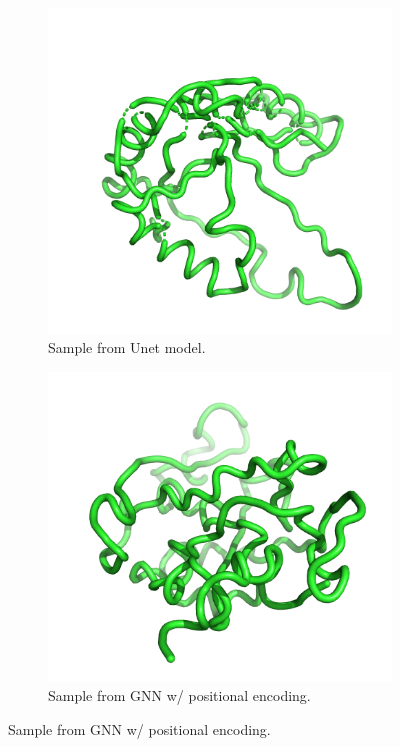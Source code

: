 \documentclass[a4paper,12pt]{article}
\begin{document}
\begin{figure}[htbp]
\begin{subfigure}[b]{0.495\textwidth}
        \includegraphics[width=0.95\linewidth]{1ak6A00_gen_unet.png}
        \caption{Sample from Unet model.}
        \label{fig:sample-unet}
    \end{subfigure}
    \begin{subfigure}[b]{0.495\textwidth}
        \centering
        \includegraphics[width=\linewidth]{1ak6A00_gen_pos.png}
        \caption{Sample from GNN w/ positional encoding.}

\end{subfigure}
\end{figure}
\end{document}
